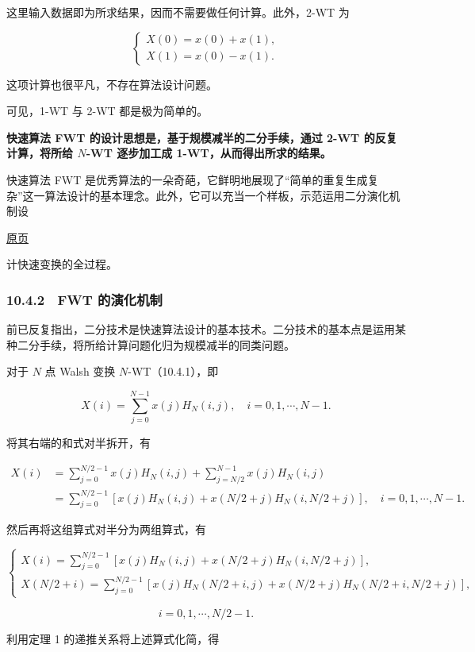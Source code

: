 \documentclass[
  10pt,
  fontset=fandol]{ctexart}
\begin{document}
这里输入数据即为所求结果，因而不需要做任何计算。此外，2-WT 为

\[
\begin{cases}
X(0)=x(0)+x(1),\\
X(1)=x(0)-x(1).
\end{cases}
\]

这项计算也很平凡，不存在算法设计问题。

可见，1-WT 与 2-WT 都是极为简单的。

\textbf{快速算法 FWT 的设计思想是，基于规模减半的二分手续，通过 2-WT 的反复计算，将所给 \(N\)-WT 逐步加工成 1-WT，从而得出所求的结果。}

快速算法 FWT 是优秀算法的一朵奇葩，它鲜明地展现了``简单的重复生成复杂''这一算法设计的基本理念。此外，它可以充当一个样板，示范运用二分演化机制设

\href{../../source-images/pdf-271.jpeg}{原页}

计快速变换的全过程。

\subsubsection{10.4.2　FWT 的演化机制}\label{fwt-ux7684ux6f14ux5316ux673aux5236}

前已反复指出，二分技术是快速算法设计的基本技术。二分技术的基本点是运用某种二分手续，将所给计算问题化归为规模减半的同类问题。

对于 \(N\) 点 Walsh 变换 \(N\)-WT（10.4.1），即

\[
X(i)=\sum_{j=0}^{N-1}x(j)H_N(i,j),\quad i=0,1,\cdots,N-1.
\]

将其右端的和式对半拆开，有

\[
\begin{aligned}
X(i)&=\sum_{j=0}^{N/2-1}x(j)H_N(i,j)+\sum_{j=N/2}^{N-1}x(j)H_N(i,j)\\
&=\sum_{j=0}^{N/2-1}[x(j)H_N(i,j)+x(N/2+j)H_N(i,N/2+j)],\quad i=0,1,\cdots,N-1.
\end{aligned}
\]

然后再将这组算式对半分为两组算式，有

\[
\begin{cases}
\displaystyle X(i)=\sum_{j=0}^{N/2-1}[x(j)H_N(i,j)+x(N/2+j)H_N(i,N/2+j)],\\[6pt]
\displaystyle X(N/2+i)=\sum_{j=0}^{N/2-1}[x(j)H_N(N/2+i,j)+x(N/2+j)H_N(N/2+i,N/2+j)],
\end{cases}
\]

\[
i=0,1,\cdots,N/2-1.
\]

利用定理 1 的递推关系将上述算式化简，得
\end{document}
